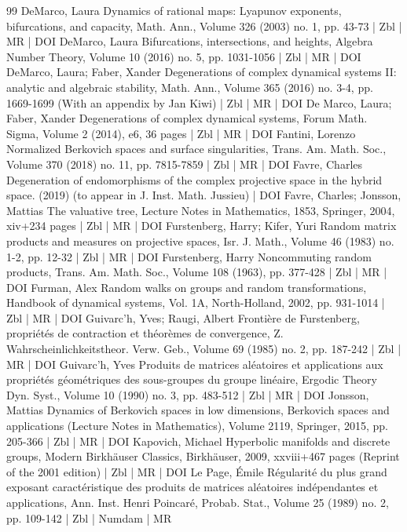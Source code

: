 \begin{thebibliography}{99}
DeMarco, Laura Dynamics of rational maps: Lyapunov exponents, bifurcations, and capacity, Math. Ann., Volume 326 (2003) no. 1, pp. 43-73 | Zbl | MR | DOI
DeMarco, Laura Bifurcations, intersections, and heights, Algebra Number Theory, Volume 10 (2016) no. 5, pp. 1031-1056 | Zbl | MR | DOI
DeMarco, Laura; Faber, Xander Degenerations of complex dynamical systems II: analytic and algebraic stability, Math. Ann., Volume 365 (2016) no. 3-4, pp. 1669-1699 (With an appendix by Jan Kiwi) | Zbl | MR | DOI
De Marco, Laura; Faber, Xander Degenerations of complex dynamical systems, Forum Math. Sigma, Volume 2 (2014), e6, 36 pages | Zbl | MR | DOI
Fantini, Lorenzo Normalized Berkovich spaces and surface singularities, Trans. Am. Math. Soc., Volume 370 (2018) no. 11, pp. 7815-7859 | Zbl | MR | DOI
Favre, Charles Degeneration of endomorphisms of the complex projective space in the hybrid space. (2019) (to appear in J. Inst. Math. Jussieu) | DOI
Favre, Charles; Jonsson, Mattias The valuative tree, Lecture Notes in Mathematics, 1853, Springer, 2004, xiv+234 pages | Zbl | MR | DOI
Furstenberg, Harry; Kifer, Yuri Random matrix products and measures on projective spaces, Isr. J. Math., Volume 46 (1983) no. 1-2, pp. 12-32 | Zbl | MR | DOI
Furstenberg, Harry Noncommuting random products, Trans. Am. Math. Soc., Volume 108 (1963), pp. 377-428 | Zbl | MR | DOI
Furman, Alex Random walks on groups and random transformations, Handbook of dynamical systems, Vol. 1A, North-Holland, 2002, pp. 931-1014 | Zbl | MR | DOI
Guivarc’h, Yves; Raugi, Albert Frontière de Furstenberg, propriétés de contraction et théorèmes de convergence, Z. Wahrscheinlichkeitstheor. Verw. Geb., Volume 69 (1985) no. 2, pp. 187-242 | Zbl | MR | DOI
Guivarc’h, Yves Produits de matrices aléatoires et applications aux propriétés géométriques des sous-groupes du groupe linéaire, Ergodic Theory Dyn. Syst., Volume 10 (1990) no. 3, pp. 483-512 | Zbl | MR | DOI
Jonsson, Mattias Dynamics of Berkovich spaces in low dimensions, Berkovich spaces and applications (Lecture Notes in Mathematics), Volume 2119, Springer, 2015, pp. 205-366 | Zbl | MR | DOI
Kapovich, Michael Hyperbolic manifolds and discrete groups, Modern Birkhäuser Classics, Birkhäuser, 2009, xxviii+467 pages (Reprint of the 2001 edition) | Zbl | MR | DOI
Le Page, Émile Régularité du plus grand exposant caractéristique des produits de matrices aléatoires indépendantes et applications, Ann. Inst. Henri Poincaré, Probab. Stat., Volume 25 (1989) no. 2, pp. 109-142 | Zbl | Numdam | MR

\end{thebibliography}

